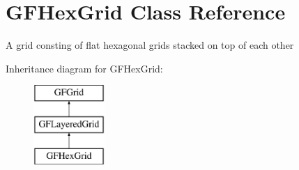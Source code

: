 \hypertarget{class_g_f_hex_grid}{\section{G\+F\+Hex\+Grid Class Reference}
\label{class_g_f_hex_grid}
}


A grid consting of flat hexagonal grids stacked on top of each other 


Inheritance diagram for G\+F\+Hex\+Grid\+:\begin{figure}[H]
\begin{center}
\leavevmode
\includegraphics[height=3.000000cm]{class_g_f_hex_grid}
\end{center}
\end{figure}
